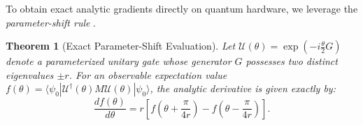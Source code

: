 \documentclass[journal]{IEEEtran}
\newtheorem{theorem}{Theorem}
\begin{document}
To obtain exact analytic gradients directly on quantum hardware, we leverage the \textit{parameter-shift rule} \cite{mitarai2018quantum, schuld2019evaluating}.

\begin{theorem}[Exact Parameter-Shift Evaluation]
Let $\mathcal{U}(\theta) = \exp(-i \frac{\theta}{2} G)$ denote a parameterized unitary gate whose generator $G$ possesses two distinct eigenvalues $\pm r$. For an observable expectation value $f(\theta) = \langle \psi_0 | \mathcal{U}^\dagger(\theta) M \mathcal{U}(\theta) | \psi_0 \rangle$, the analytic derivative is given exactly by:
\begin{equation}
\frac{d f(\theta)}{d\theta} = r \left[ f\left(\theta + \frac{\pi}{4r}\right) - f\left(\theta - \frac{\pi}{4r}\right) \right].
\label{eq:param_shift_theorem}
\end{equation}
\end{theorem}
\end{document}
